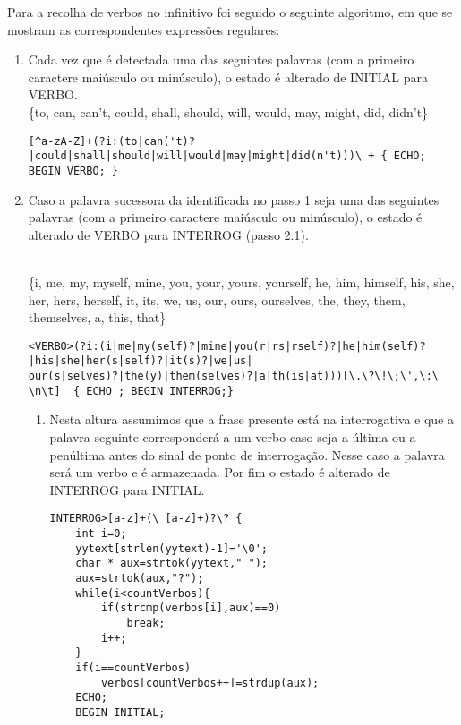\documentclass{report}
\begin{document}
Para a recolha de verbos no infinitivo foi seguido o seguinte algoritmo, em que se mostram as correspondentes expressões regulares:
\\
\begin{enumerate}
\item Cada vez que é  detectada uma das seguintes palavras  (com a primeiro caractere maiúsculo ou minúsculo), o estado é alterado de INITIAL para VERBO.
\\
\{to, can, can't, could, shall, should, will, would, may, might, did, didn't\}

\begin{verbatim}
[^a-zA-Z]+(?i:(to|can('t)?|could|shall|should|will|would|may|might|did(n't)))\ + { ECHO; BEGIN VERBO; }
\end{verbatim}


\item Caso a palavra sucessora da identificada no passo 1 seja uma das seguintes palavras (com a primeiro caractere maiúsculo ou minúsculo), o estado é alterado de VERBO para INTERROG (passo 2.1).

\\
\{i, me, my, myself, mine, you, your, yours, yourself, he, him, himself, his, she, her, hers, herself, it, its, we, us, our, ours, ourselves, the, they, them, themselves, a, this, that\}

\begin{verbatim}
<VERBO>(?i:(i|me|my(self)?|mine|you(r|rs|rself)?|he|him(self)?|his|she|her(s|self)?|it(s)?|we|us|
our(s|selves)?|the(y)|them(selves)?|a|th(is|at)))[\.\?\!\;\',\:\ \n\t]  { ECHO ; BEGIN INTERROG;}
\end{verbatim}

\begin{enumerate}
\item Nesta altura assumimos que a frase presente está na interrogativa e que a palavra seguinte corresponderá a um verbo caso seja a última ou a penúltima antes do sinal de ponto de interrogação. Nesse caso a palavra será um verbo e é armazenada. Por fim o estado é alterado de INTERROG para INITIAL.

\begin{verbatim}
INTERROG>[a-z]+(\ [a-z]+)?\? {
    int i=0;
    yytext[strlen(yytext)-1]='\0';
    char * aux=strtok(yytext," ");
    aux=strtok(aux,"?");
    while(i<countVerbos){
        if(strcmp(verbos[i],aux)==0)
            break;
        i++;
    }
    if(i==countVerbos)
        verbos[countVerbos++]=strdup(aux);
    ECHO;
    BEGIN INITIAL;
\end{verbatim}
\end{enumerate}


\end{enumerate}
\end{document}
